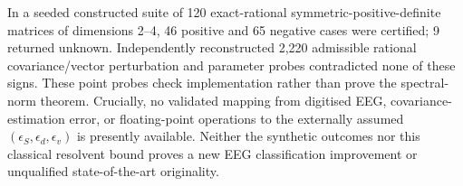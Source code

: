 In a seeded constructed suite of 120 exact-rational
symmetric-positive-definite matrices of dimensions
2--4, 46 positive and 65 negative cases were certified;
9 returned unknown. Independently reconstructed
2,220 admissible rational covariance/vector perturbation
and parameter probes contradicted none of these signs.
These point probes check implementation rather than
prove the spectral-norm theorem. Crucially, no validated
mapping from digitised EEG, covariance-estimation error,
or floating-point operations to the externally assumed
$(\epsilon_S,\epsilon_d,\epsilon_v)$ is presently available.
Neither the synthetic outcomes nor this classical
resolvent bound proves a new EEG classification
improvement or unqualified state-of-the-art originality.
